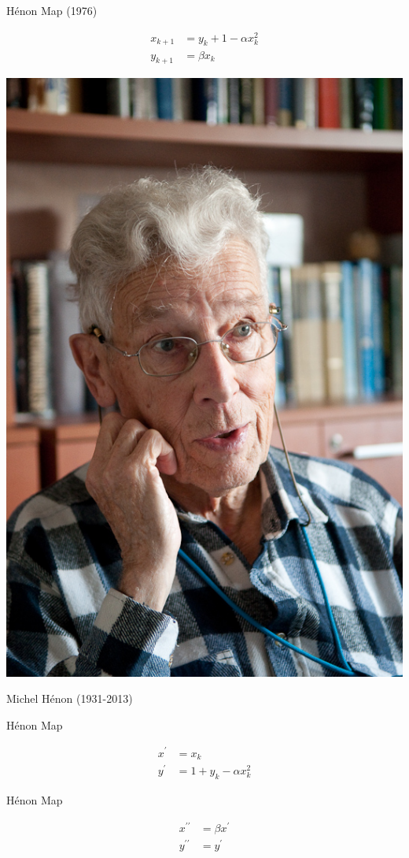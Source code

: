 \documentclass[usenames, dvipsnames, aspectratio=169]{beamer}
\begin{document}
\begin{frame}[t, c]{Hénon Map (1976)}{}
  \vfill
  \large

  \begin{minipage}{.48\textwidth}
    \[
    \begin{aligned}
      x_{k+1} & = y_k + 1 - \alpha x_k^2 \\
      y_{k+1} & = \beta x_k
    \end{aligned}
    \]
  \end{minipage}%
  \hfill
  \begin{minipage}{.48\textwidth}
    \centering
    \includegraphics[width=.5\textwidth]{henon}

    \bigskip

    \tiny
    Michel Hénon (1931-2013)
  \end{minipage}

  \vfill
\end{frame}

\begin{frame}[t, c]{Hénon Map}{}
  \vfill
  \large
  \centering

  \[
  \begin{aligned}
    x^{\prime} & = x_k \\
    y^{\prime} & = 1 + y_k - \alpha x_k^2
  \end{aligned}
  \]

  \vfill
\end{frame}


\begin{frame}[t, c]{Hénon Map}{}
  \vfill
  \large
  \centering

  \[
  \begin{aligned}
    x^{\prime\prime} & = \beta x^{\prime} \\
    y^{\prime\prime} & = y^{\prime}
  \end{aligned}
  \]

  \vfill
\end{frame}
\end{document}
